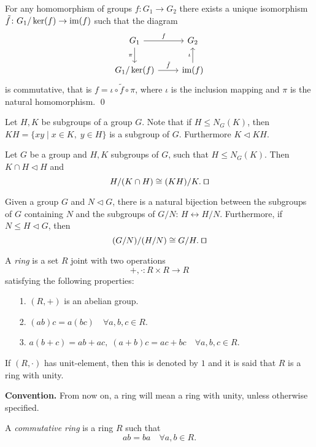 \begin{theorem}
	For any homomorphism of groups $f\colon G_1\rightarrow G_2$ there exists a unique isomorphism $\tilde f\colon G_1/\ker(f)\rightarrow\operatorname{im}(f)$ such that the diagram
	\[\begin{tikzcd}
		{G_1} & {G_2} \\
		{G_1/\ker(f)} & {\im(f)}
		\arrow["f", from=1-1, to=1-2]
		\arrow["{\pi}"', from=1-1, to=2-1]
		\arrow["{\iota}", from=2-2, to=1-2]
		\arrow["{\tilde f}", from=2-1, to=2-2]
	\end{tikzcd}
	\]
	is commutative, that is $f=\iota\circ \tilde f\circ\pi$, where $\iota$ is the inclusion mapping and $\pi$ is the natural homomorphism. \qed	
	\end{theorem} 
 
Let $H,K$ be subgroups of a group $G$. Note that if $H\leq N_G(K)$, then $KH=\{xy\mid x\in K,\; y\in H\}$ is a subgroup of $G$. Furthermore $K\lhd KH$.

\begin{theorem}
	Let $G$ be a group and $H,K$ subgroups of $G$, such that $H\leq N_G(K)$. Then $K\cap H\lhd H$ and
	$$H/(K\cap H)\cong (KH)/K. \; \qed$$  
	\end{theorem}

\begin{theorem} Given a group $G$ and $N\lhd G$, there is a natural bijection between the subgroups of $G$ containing $N$ and the subgroups of $G/N$: $H\leftrightarrow H/N$. Furthermore, if $N\leq H\lhd G$, then
	$$(G/N)/(H/N)\cong G/H.\; \qed$$ 
	\end{theorem}


A {\em ring} is a set $R$ joint with two operations
$$+,\cdot\colon R\times R\rightarrow R$$
satisfying the following properties:
\begin{itemize}
	\item[1.] $(R,+)$ is an abelian group.
	\item[2.] $(ab)c=a(bc)\quad\forall a,b,c\in R$.
    \item[3.] $a(b+c)=ab+ac,\; (a+b)c=ac+bc\quad\forall a,b,c\in R$.
\end{itemize}
If $(R,\cdot)$ has unit-element, then this is denoted by $1$ and it is said that $R$ is a ring with unity.
\bigskip

{\bf Convention.} From now on, a ring will mean a ring with unity, unless otherwise specified. 
\bigskip

A {\em commutative ring} is a ring $R$ such that
$$ab=ba\quad\forall a,b\in R.$$

